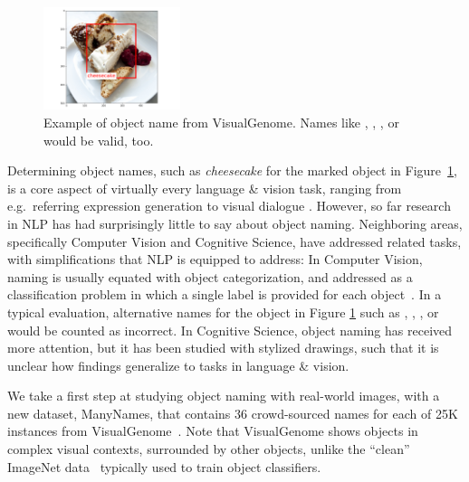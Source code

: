 \begin{figure}[tbp]
\begin{center}
\includegraphics[height=3cm]{figures/cheesecake.png}
\caption{Example of object name from VisualGenome. Names like , , , or  would be valid, too.}
\label{fig:cake}
\end{center}
\end{figure}

Determining object names, such as \emph{cheesecake} for the marked object in Figure~\ref{fig:cake}, is a core aspect of virtually every language \& vision task, ranging from e.g.\ referring expression generation to visual dialogue \cite{fangetal:2015,devlin:imcaqui,Bernardietal:automatic,das2017visual,vries2017guesswhat}.
However, so far research in NLP has had surprisingly little to say about object naming.
Neighboring areas, specifically Computer Vision and Cognitive Science, have addressed related tasks, with simplifications that NLP is equipped to address:
In Computer Vision, naming is usually equated with object categorization, and addressed as a classification problem in which a single label is provided for each object~\cite{googlenet}.
In a typical evaluation, alternative names for the object in Figure \ref{fig:cake} such as , , , or  would be counted as incorrect.
In Cognitive Science, object naming has received more attention, but it has been studied with stylized drawings, such that it is unclear how findings generalize to tasks in language \& vision.

We take a first step at studying object naming with real-world images, with a new dataset, ManyNames, that contains 36 crowd-sourced names for each of 25K instances from VisualGenome~\cite{krishna2016visualgenome}.
Note that VisualGenome shows objects in complex visual contexts, surrounded by other objects, unlike the ``clean'' ImageNet data~\cite{} typically used to train object classifiers.

